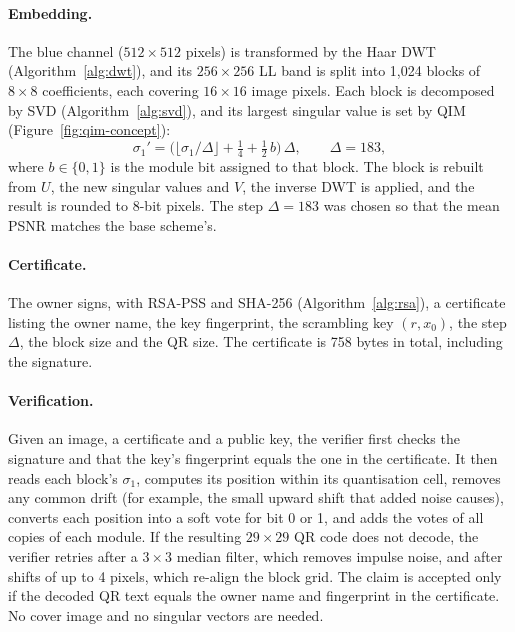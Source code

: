\documentclass[11pt,a4paper]{article}
\begin{document}
\paragraph{Embedding.} The blue channel ($512\times512$ pixels) is transformed by the Haar DWT (Algorithm~\ref{alg:dwt}), and its $256\times256$ LL band is split into 1,024 blocks of $8\times8$ coefficients, each covering $16\times16$ image pixels. Each block is decomposed by SVD (Algorithm~\ref{alg:svd}), and its largest singular value is set by QIM (Figure~\ref{fig:qim-concept}):
\begin{equation}
\sigma_1' = \Big(\big\lfloor \sigma_1/\Delta \big\rfloor + \tfrac14 + \tfrac12\,b\Big)\,\Delta,\qquad \Delta = 183,
\end{equation}
where $b\in\{0,1\}$ is the module bit assigned to that block. The block is rebuilt from $U$, the new singular values and $V$, the inverse DWT is applied, and the result is rounded to 8-bit pixels. The step $\Delta=183$ was chosen so that the mean PSNR matches the base scheme's.

\paragraph{Certificate.} The owner signs, with RSA-PSS and SHA-256 (Algorithm~\ref{alg:rsa}), a certificate listing the owner name, the key fingerprint, the scrambling key $(r,x_0)$, the step $\Delta$, the block size and the QR size. The certificate is 758 bytes in total, including the signature.

\paragraph{Verification.} Given an image, a certificate and a public key, the verifier first checks the signature and that the key's fingerprint equals the one in the certificate. It then reads each block's $\sigma_1$, computes its position within its quantisation cell, removes any common drift (for example, the small upward shift that added noise causes), converts each position into a soft vote for bit 0 or 1, and adds the votes of all copies of each module. If the resulting $29\times29$ QR code does not decode, the verifier retries after a $3\times3$ median filter, which removes impulse noise, and after shifts of up to 4 pixels, which re-align the block grid. The claim is accepted only if the decoded QR text equals the owner name and fingerprint in the certificate. No cover image and no singular vectors are needed.
\end{document}
